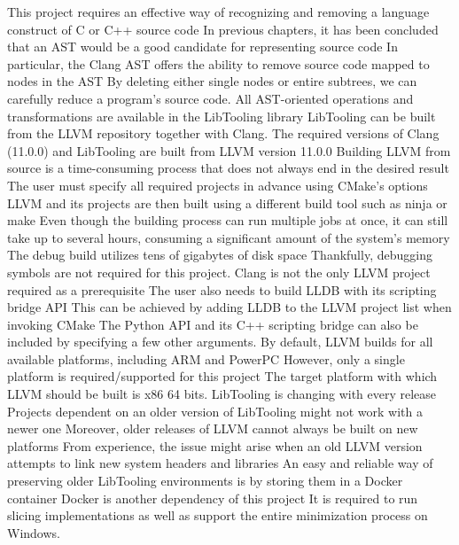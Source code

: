 This project requires an effective way of recognizing and removing a language construct of C or C++ source code
In previous chapters, it has been concluded that an AST would be a good candidate for representing source code
In particular, the Clang AST offers the ability to remove source code mapped to nodes in the AST
By deleting either single nodes or entire subtrees, we can carefully reduce a program's source code.
All AST-oriented operations and transformations are available in the LibTooling library
LibTooling can be built from the LLVM repository together with Clang.
The required versions of Clang (11.0.0) and LibTooling are built from LLVM version 11.0.0
Building LLVM from source is a time-consuming process that does not always end in the desired result
The user must specify all required projects in advance using CMake's options
LLVM and its projects are then built using a different build tool such as ninja or make
Even though the building process can run multiple jobs at once, it can still take up to several hours, consuming a significant amount of the system's memory
The debug build utilizes tens of gigabytes of disk space
Thankfully, debugging symbols are not required for this project.
Clang is not the only LLVM project required as a prerequisite
 The user also needs to build LLDB with its scripting bridge API
This can be achieved by adding LLDB to the LLVM project list when invoking CMake
The Python API and its C++ scripting bridge can also be included by specifying a few other arguments.
By default, LLVM builds for all available platforms, including ARM and PowerPC
However, only a single platform is required/supported for this project
The target platform with which LLVM should be built is x86 64 bits.
LibTooling is changing with every release
Projects dependent on an older version of LibTooling might not work with a newer one
Moreover, older releases of LLVM cannot always be built on new platforms
From experience, the issue might arise when an old LLVM version attempts to link new system headers and libraries
An easy and reliable way of preserving older LibTooling environments is by storing them in a Docker container
Docker is another dependency of this project
It is required to run slicing implementations as well as support the entire minimization process on Windows.

